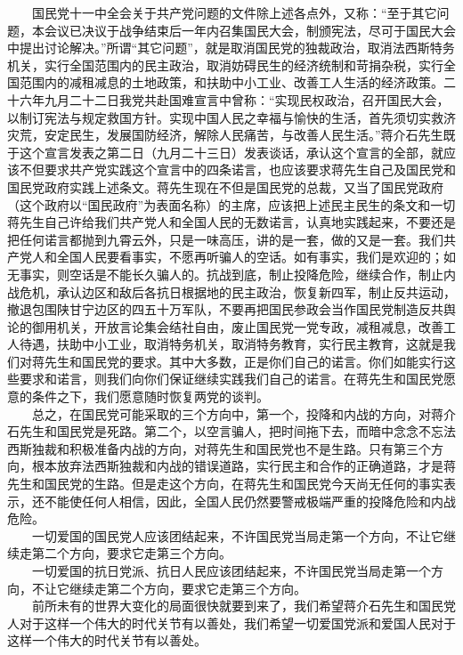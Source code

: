 \documentclass[cn,11pt,chinese]{elegantbook}
\begin{document}
　　国民党十一中全会关于共产党问题的文件除上述各点外，又称：“至于其它问题，本会议已决议于战争结束后一年内召集国民大会，制颁宪法，尽可于国民大会中提出讨论解决。”所谓“其它问题”，就是取消国民党的独裁政治，取消法西斯特务机关，实行全国范围内的民主政治，取消妨碍民生的经济统制和苛捐杂税，实行全国范围内的减租减息的土地政策，和扶助中小工业、改善工人生活的经济政策。二十六年九月二十二日我党共赴国难宣言中曾称：“实现民权政治，召开国民大会，以制订宪法与规定救国方针。实现中国人民之幸福与愉快的生活，首先须切实救济灾荒，安定民生，发展国防经济，解除人民痛苦，与改善人民生活。”蒋介石先生既于这个宣言发表之第二日（九月二十三日）发表谈话，承认这个宣言的全部，就应该不但要求共产党实践这个宣言中的四条诺言，也应该要求蒋先生自己及国民党和国民党政府实践上述条文。蒋先生现在不但是国民党的总裁，又当了国民党政府（这个政府以“国民政府”为表面名称）的主席，应该把上述民主民生的条文和一切蒋先生自己许给我们共产党人和全国人民的无数诺言，认真地实践起来，不要还是把任何诺言都抛到九霄云外，只是一味高压，讲的是一套，做的又是一套。我们共产党人和全国人民要看事实，不愿再听骗人的空话。如有事实，我们是欢迎的；如无事实，则空话是不能长久骗人的。抗战到底，制止投降危险，继续合作，制止内战危机，承认边区和敌后各抗日根据地的民主政治，恢复新四军，制止反共运动，撤退包围陕甘宁边区的四五十万军队，不要再把国民参政会当作国民党制造反共舆论的御用机关，开放言论集会结社自由，废止国民党一党专政，减租减息，改善工人待遇，扶助中小工业，取消特务机关，取消特务教育，实行民主教育，这就是我们对蒋先生和国民党的要求。其中大多数，正是你们自己的诺言。你们如能实行这些要求和诺言，则我们向你们保证继续实践我们自己的诺言。在蒋先生和国民党愿意的条件之下，我们愿意随时恢复两党的谈判。\\
　　总之，在国民党可能采取的三个方向中，第一个，投降和内战的方向，对蒋介石先生和国民党是死路。第二个，以空言骗人，把时间拖下去，而暗中念念不忘法西斯独裁和积极准备内战的方向，对蒋先生和国民党也不是生路。只有第三个方向，根本放弃法西斯独裁和内战的错误道路，实行民主和合作的正确道路，才是蒋先生和国民党的生路。但是走这个方向，在蒋先生和国民党今天尚无任何的事实表示，还不能使任何人相信，因此，全国人民仍然要警戒极端严重的投降危险和内战危险。\\
　　一切爱国的国民党人应该团结起来，不许国民党当局走第一个方向，不让它继续走第二个方向，要求它走第三个方向。\\
　　一切爱国的抗日党派、抗日人民应该团结起来，不许国民党当局走第一个方向，不让它继续走第二个方向，要求它走第三个方向。\\
　　前所未有的世界大变化的局面很快就要到来了，我们希望蒋介石先生和国民党人对于这样一个伟大的时代关节有以善处，我们希望一切爱国党派和爱国人民对于这样一个伟大的时代关节有以善处。\\
\end{document}
